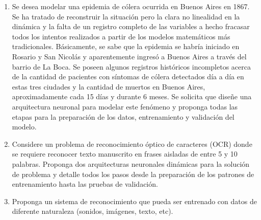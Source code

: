 \documentclass[a4paper,10pt,spanish,oneside]{article}
\begin{document}
\begin{enumerate}
\item Se desea modelar una epidemia de cólera ocurrida en Buenos Aires en 1867. Se ha tratado de reconstruir la situación pero la clara no linealidad en la dinámica y la falta de un registro completo de las variables a hecho fracasar todos los intentos realizados a partir de los modelos matemáticos más tradicionales. Básicamente, se sabe que la epidemia se habría iniciado en Rosario y San Nicolás y aparentemente ingresó a Buenos Aires a través del barrio de La Boca. Se poseen algunos registros históricos incompletos acerca de la cantidad de pacientes con síntomas de cólera detectados día a día en estas tres ciudades y la cantidad de muertos en Buenos Aires, aproximadamente cada 15 días y durante 6 meses. Se solicita que diseñe una arquitectura neuronal para modelar este fenómeno y proponga todas las etapas para la preparación de los datos, entrenamiento y validación del modelo.

\item Considere un problema de reconocimiento óptico de caracteres (OCR) donde se requiere reconocer texto manuscrito en frases aisladas de entre 5 y 10 palabras. Proponga dos arquitecturas neuronales dinámicas para la solución de problema y detalle todos los pasos desde la preparación de los patrones de entrenamiento hasta las pruebas de validación.

\item Proponga un sistema de reconocimiento que pueda ser entrenado con datos de diferente naturaleza (sonidos, imágenes, texto, etc).
\end{enumerate}
\end{document}
